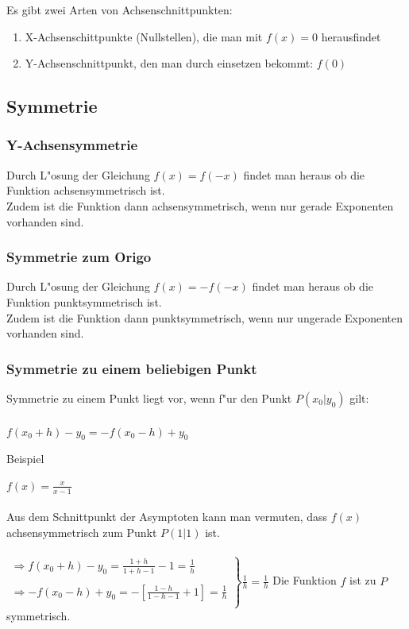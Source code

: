 Es gibt zwei Arten von Achsenschnittpunkten:
\begin{enumerate}
\item X-Achsenschittpunkte (Nullstellen), die man mit $f(x)=0$ herausfindet
\item Y-Achsenschnittpunkt, den man durch einsetzen bekommt: $f(0)$ \\
\end{enumerate}

\subsection{Symmetrie}

\subsubsection{Y-Achsensymmetrie}

Durch L"osung der Gleichung $f(x)=f(-x)$ findet man heraus ob die Funktion achsensymmetrisch ist.\\
Zudem ist die Funktion dann achsensymmetrisch, wenn nur gerade Exponenten vorhanden sind.\\

\subsubsection{Symmetrie zum Origo}

Durch L"osung der Gleichung $f(x)=-f(-x)$ findet man heraus ob die Funktion punktsymmetrisch ist.\\
Zudem ist die Funktion dann punktsymmetrisch, wenn nur ungerade Exponenten vorhanden sind.\\


\subsubsection{Symmetrie zu einem beliebigen Punkt}

Symmetrie zu einem Punkt liegt vor, wenn f"ur den Punkt $P(x_{0}|y_{0})$ gilt:\\
\\
$f(x_{0}+h)-y_{0}=-f(x_{0}-h)+y_{0}$

\begin{Bemerkung}
Beispiel\\
\end{Bemerkung}
$f(x)=\frac{x}{x-1}$\\
\\
Aus dem Schnittpunkt der Asymptoten kann man vermuten, dass $f(x)$ achsensymmetrisch zum Punkt $P(1|1)$ ist.\\
\\
$\left. \begin{array}{rcl}
\Rightarrow f(x_{0}+h)-y_{0}=\frac{1+h}{1+h-1}-1=\frac{1}{h}\\
\\
\Rightarrow -f(x_{0}-h)+y_{0}=-[\frac{1-h}{1-h-1}+1]=\frac{1}{h}\\
\end{array}\right\} \frac{1}{h}=\frac{1}{h}$ Die Funktion $f$ ist zu $P$ symmetrisch.\\



